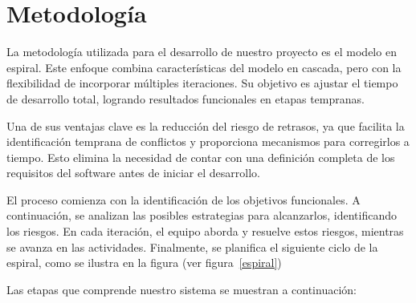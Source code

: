 \section{Metodología}
\label{cap:Meto}

	La metodología utilizada para el desarrollo de nuestro proyecto es el modelo en espiral. Este enfoque combina características del modelo en cascada, pero con la flexibilidad de incorporar múltiples iteraciones. Su objetivo es ajustar el tiempo de desarrollo total, logrando resultados funcionales en etapas tempranas. 
	
	Una de sus ventajas clave es la reducción del riesgo de retrasos, ya que facilita la identificación temprana de conflictos y proporciona mecanismos para corregirlos a tiempo. Esto elimina la necesidad de contar con una definición completa de los requisitos del software antes de iniciar el desarrollo. 
	
	\newpage
	
	El proceso comienza con la identificación de los objetivos funcionales. A continuación, se analizan las posibles estrategias para alcanzarlos, identificando los riesgos. En cada iteración, el equipo aborda y resuelve estos riesgos, mientras se avanza en las actividades. Finalmente, se planifica el siguiente ciclo de la espiral, como se ilustra en la figura (ver figura~\ref{espiral})
	
	



	Las etapas que comprende nuestro sistema se muestran a continuación:
	
